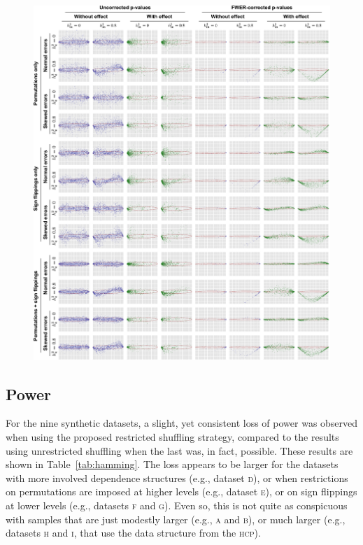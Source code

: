 \begin{figure}[!p]
\centering
\hspace*{-5mm}\includegraphics[scale=.9]{figures/bland_altman.pdf}
\label{fig:bland_altman_noref}
\end{figure}

\subsection{Power}

For the nine synthetic datasets, a slight, yet consistent loss of power was observed when using the proposed restricted shuffling strategy, compared to the results using unrestricted shuffling when the last was, in fact, possible. These results are shown in Table~\ref{tab:hamming}. The loss appears to be larger for the datasets with more involved dependence structures (e.g., dataset \textsc{d}), or when restrictions on permutations are imposed at higher levels (e.g., dataset \textsc{e}), or on sign flippings at lower levels (e.g., datasets \textsc{f} and \textsc{g}). Even so, this is not quite as conspicuous with samples that are just modestly larger (e.g., \textsc{a} and \textsc{b}), or much larger (e.g., datasets \textsc{h} and \textsc{i}, that use the data structure from the \textsc{hcp}).


